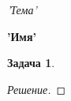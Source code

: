 \documentclass{article}
\newtheorem{problem}{Задача}
\newenvironment{solution}[1][Решение]{\vspace{-\parskip}\begin{proof}[#1]}{\end{proof}}
\begin{document}
\begin{center}
\textit{'Тема'}

\textbf{'Имя'}

\end{center}

\begin{problem}

\end{problem}
\begin{solution}

\end{solution}
\end{document}
